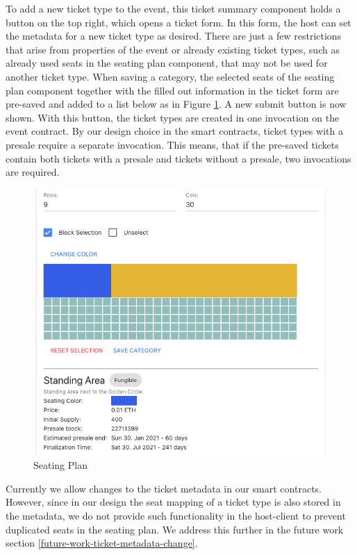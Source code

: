To add a new ticket type to the event, this ticket summary component holds a button on the top right, which opens a ticket form. In this form, the host can set the metadata for a new ticket type as desired. There are just a few restrictions that arise from properties of the event or already existing ticket types, such as already used seats in the seating plan component, that may not be used for another ticket type. When saving a category, the selected seats of the seating plan component together with the filled out information in the ticket form are pre-saved and added to a list below as in Figure \ref{img:host-seating-plan}. A new submit button is now shown. With this button, the ticket types are created in one invocation on the event contract. By our design choice in the smart contracts, ticket types with a presale require a separate invocation. This means, that if the pre-saved tickets contain both tickets with a presale and tickets without a presale, two invocations are required.

\begin{figure}[H]
    \centering
    \includegraphics[width=14cm]{images/host-seating-plan.png}
    \caption{Seating Plan \protect}
    \label{img:host-seating-plan}
\end{figure}

Currently we allow changes to the ticket metadata in our smart contracts. However, since in our design the seat mapping of a ticket type is also stored in the metadata, we do not provide such functionality in the host-client to prevent duplicated seats in the seating plan. We address this further in the future work section \ref{future-work-ticket-metadata-change}.

